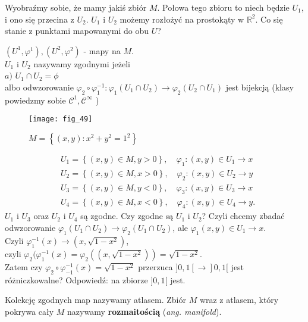 \documentclass[../main.tex]{subfiles}
\begin{document}
Wyobraźmy sobie, że mamy jakiś zbiór $M$. Połowa tego zbioru to niech będzie $U_1$, i ono się przecina z $U_2$. $U_1$ i $U_2$ możemy rozłożyć na prostokąty w $\mathbb{R}^2$. Co się stanie z punktami mapowanymi do obu $U$?
\begin{definicja}
    $(U^1,\varphi^1), (U^2,\varphi^2)$ - mapy na $M$.\\
    $U_1$ i $U_2$ nazywamy zgodnymi jeżeli\\
    $a)$ $U_1\cap U_2 = \phi$\\
    albo odwzorowanie $\varphi_2 \circ \varphi_1^{-1}: \varphi_1(U_1\cap U_2)\to \varphi_2(U_2\cap U_1)$ jest bijekcją (klasy powiedzmy sobie $\mathcal{C}^1, \mathcal{C}^{\infty}$ )
\end{definicja}
    \begin{figure}[h]
        \centering
        \texttt{[image: fig\_49]}
        \caption{$M = \left\{ (x,y): x^2 + y^2 = 1^2 \right\}$}
    \end{figure}
\begin{przyklad}
    \begin{align*}
    &U_1 = \left\{ (x,y)\in M, y>0 \right\},\quad \varphi_1: (x,y)\in U_1 \to x\\
    &U_2 = \left\{ (x,y)\in M, x>0 \right\},\quad \varphi_2: (x,y)\in U_2 \to y\\
    &U_3 = \left\{ (x,y)\in M, y<0 \right\},\quad \varphi_3: (x,y)\in U_3 \to x\\
    &U_4 = \left\{ (x,y)\in M, x<0 \right\},\quad \varphi_4: (x,y)\in U_4 \to y
    .\end{align*}
    $U_1$ i $U_3$ oraz $U_2$ i $U_4$ są zgodne. Czy zgodne są $U_1$ i $U_2$? Czyli chcemy zbadać odwzorowanie $\varphi_1(U_1\cap U_2)\to \varphi_2(U_1\cap U_2)$, ale $\varphi_1(x,y)\in U_1\to x$.\\
    Czyli $\varphi_1^{-1}(x)\to \left( x, \sqrt{1-x^2}  \right) $,\\
    czyli $\varphi_2(\varphi_1^{-1}(x) = \varphi_2((x,\sqrt{1-x^2} )) = \sqrt{1-x^2} $.\\
    Zatem czy $\varphi_2 \circ \varphi_{-1}^{-1}(x) = \sqrt{1-x^2} $ przerzuca $]0,1[\to]0,1[$ jest różniczkowalne? Odpowiedź: na zbiorze $]0,1[$ jest.
\end{przyklad}
\begin{definicja}
    Kolekcję zgodnych map nazywamy atlasem. Zbiór $M$ wraz z atlasem, który pokrywa cały $M$ nazywamy \textbf{rozmaitością} (\textit{ang. manifold}).
\end{definicja}
\end{document}
